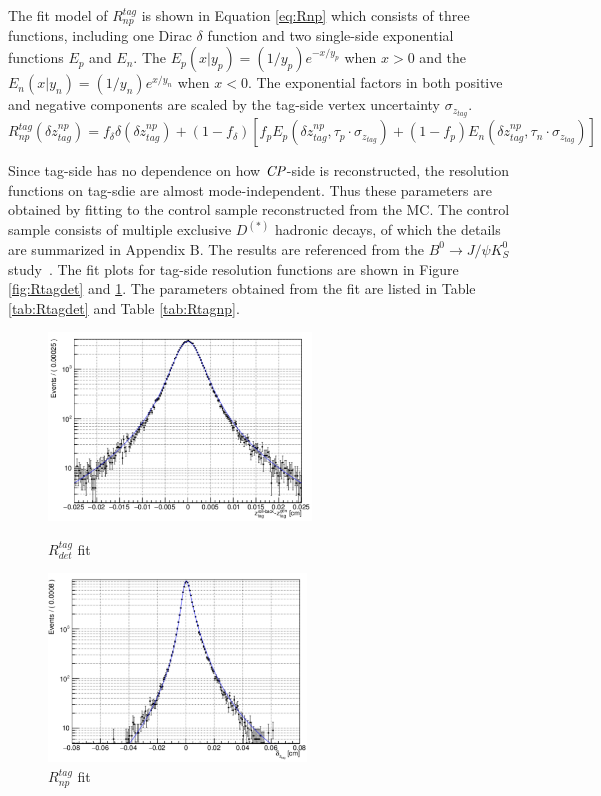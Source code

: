 The fit model of $R_{np}^{tag}$ is shown in Equation \ref{eq:Rnp} which consists of three functions, including one Dirac $\delta$ function and two single-side exponential functions $E_p$ and $E_n$. The $E_p(x|y_p)=(1/y_p)e^{-x/y_p} $ when $x > 0$ and the $E_n(x|y_n)=(1/y_n)e^{x/y_n} $ when $x < 0$.
The exponential factors in both positive and negative components are scaled by the tag-side vertex uncertainty $\sigma_{z_{tag}}$. 
\begin{equation}\label{eq:Rnp}
R_{np}^{tag}(\delta z_{tag}^{np})=f_{\delta}\delta(\delta z_{tag}^{np}) + 
(1-f_{\delta})[f_p E_p(\delta z_{tag}^{np},\tau_p\cdot \sigma_{z_{tag}}) +
(1-f_p)E_n(\delta z_{tag}^{np},\tau_n\cdot \sigma_{z_{tag}}) ]
\end{equation} 


Since tag-side has no dependence on how $\it{CP}$-side is reconstructed, the resolution functions on tag-sdie are almost mode-independent. Thus these parameters are obtained by fitting to the control sample reconstructed from the MC. The control sample consists of multiple exclusive $D^{(*)}$ hadronic decays, of which the details are summarized in Appendix B.  The results are referenced from the $B^0\to J/\psi K^0_S$ study~\cite{jpsiks_ichep}. The fit plots for tag-side resolution functions are shown in Figure \ref{fig:Rtagdet} and \ref{fig:Rtagnp}. The parameters obtained from the fit are listed in Table \ref{tab:Rtagdet} and Table \ref{tab:Rtagnp}.


\begin{figure}[H]
	\begin{minipage}[b]{0.5\linewidth}
		\centering
		\includegraphics[height=5cm]{figures/Rdet}
		\caption{$R_{det}^{tag} $ fit}
		\label{fig:Rtagdet}
	\end{minipage}
	\begin{minipage}[b]{0.5\linewidth}
		\centering
		\includegraphics[height=5cm]{figures/Rnp}
		\caption{$R_{np}^{tag}$ fit}
		\label{fig:Rtagnp}
	\end{minipage}
\end{figure}

